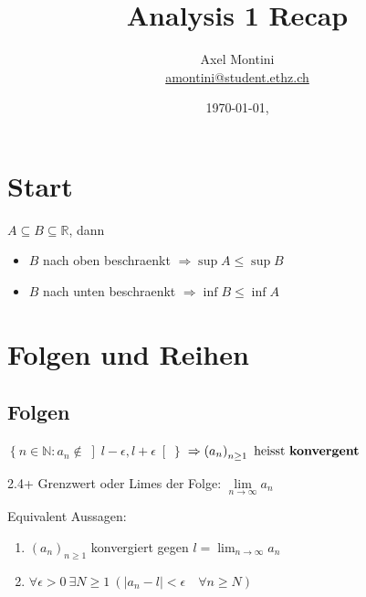 \documentclass[8pt,a4paper,twocolumn,table]{extarticle}
\title{Analysis 1 Recap}
\author{Axel Montini \\ \href{mailto:amontini@student.ethz.ch}{amontini@student.ethz.ch}}
\date{\today \hfill \texttt{\branch}, \texttt{\commit}}
\newcommand{\N}{\mathbb{N}}
\newcommand{\R}{\mathbb{R}}
\newcommand{\seq}[1]{\left( #1_n \right)_{n \ge 1}}
\begin{document}
\maketitle

\section{Start}

\begin{korollar}{1.16}
    \label{korollar:inf-sup}
    $A \subseteq B \subseteq \R$, dann
    \begin{itemize}
        \item $B$ nach oben beschraenkt $\Rightarrow \sup A \le \sup B$
        \item $B$ nach unten beschraenkt $\Rightarrow \inf B \le \inf A$
    \end{itemize}
\end{korollar}

\section{Folgen und Reihen}
\subsection{Folgen}
\begin{definition}{2.4}
    $\left\{ n \in \N : a_n \notin \left] l - \epsilon, l + \epsilon \right[ \right\}$
    $\Rightarrow \seq{a}\ \mbox{heisst \textbf{konvergent}}$
\end{definition}

\begin{definition}{2.4+}
    Grenzwert oder Limes der Folge: $\underset{n \to \infty}{\lim} a_n$
\end{definition}

\begin{lemma}
    Equivalent Aussagen:
    \begin{enumerate}
        \item $\seq{a}$ konvergiert gegen $l = \lim_{n \to \infty} a_n$
        \item $\forall \epsilon > 0\ \exists N \ge 1\ \left( \lvert a_n - l \rvert < \epsilon \quad \forall n \ge N \right)$
    \end{enumerate}
\end{lemma}
\end{document}
